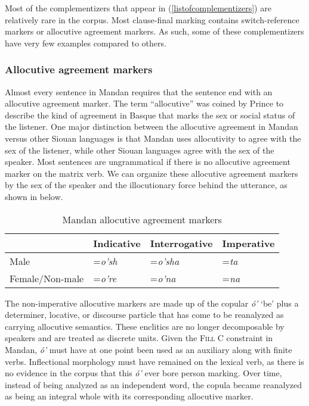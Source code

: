 Most of the complementizers that appear in (\ref{listofcomplementizers}) are relatively rare in the corpus. Most clause-final marking contains switch-reference markers or allocutive agreement markers. As such, some of these complementizers have very few examples compared to others.

\subsubsection{Allocutive agreement markers}\label{Ch3SubSubSecAllocutive}

Almost every sentence in Mandan requires that the sentence end with an allocutive agreement marker. The term ``allocutive'' was coined by Prince \citet[19]{bonaparte1862} to describe the kind of agreement in Basque that marks the sex or social status of the listener. One major distinction between the allocutive agreement in Mandan versus other Siouan languages is that Mandan uses allocutivity to agree with the sex of the listener, while other Siouan languages agree with the sex of the speaker. Most sentences are ungrammatical if there is no allocutive agreement marker on the matrix verb. We can organize these allocutive agreement markers by the sex of the speaker and the illocutionary force behind the utterance, as shown in  below.

\begin{table}
\renewcommand\thetable{3.6}
\caption{Mandan allocutive agreement markers} 
\label{allocutivetable}


	\begin{tabular}{llll}\hline\hline
		~		&
			Indicative		&
			Interrogative	&	
			Imperative\\
\midrule
		Male	&	
			=\textit{o'sh}	&	
			=\textit{o'sha}	&	
			=\textit{ta}\\
		Female/Non-male	&	
			=\textit{o're}	&	
			=\textit{o'na}	&	
			=\textit{na}\\
			\hline\hline
		\end{tabular}

\end{table}

The non-imperative allocutive markers are made up of the copular \textit{ó'} `be' plus a determiner, locative, or discourse particle that has come to be reanalyzed as carrying allocutive semantics. These enclitics are no longer decomposable by speakers and are treated as discrete units. Given the \textsc{Fill} C constraint in Mandan, \textit{ó'} must have at one point been used as an auxiliary along with finite verbs. Inflectional morphology must have remained on the lexical verb, as there is no evidence in the corpus that this \textit{ó'} ever bore person marking. Over time, instead of being analyzed as an independent word, the copula became reanalyzed as being an integral whole with its corresponding allocutive marker. 

